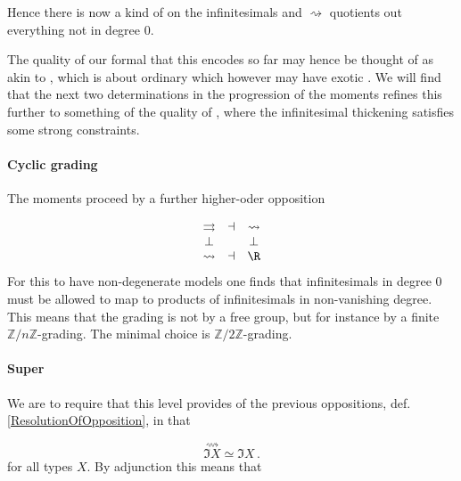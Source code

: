 \documentclass[12pt,titlepage]{article}
\newcommand{\itexarray}[1]{\begin{matrix}#1\end{matrix}}
\theoremstyle{plain}
\theoremstyle{definition}
\theoremstyle{remark}
\begin{document}
Hence there is now a kind of  on the infinitesimals and $\rightsquigarrow$ quotients out everything not in degree 0.

The  quality of our formal  that this encodes so far may hence be thought of as akin to \emph{}, which is about ordinary  which however may have exotic  . We will find that the next two determinations in the progression of the moments refines this further to something of the quality of , where the infinitesimal thickening satisfies some strong constraints.

\hypertarget{cyclic_grading}{}\paragraph*{{Cyclic grading}}\label{cyclic_grading}

The moments proceed by a further higher-oder opposition

\begin{displaymath}
\itexarray{
    \rightrightarrows &\dashv& \rightsquigarrow
    \\
    \bot && \bot
    \\
    \rightsquigarrow &\dashv& \R
  }
\end{displaymath}
For this to have non-degenerate models one finds that infinitesimals in degree 0 must be allowed to map to products of infinitesimals in non-vanishing degree. This means that the grading is not by a free group, but for instance by a finite  $\mathbb{Z}/n\mathbb{Z}$-grading. The minimal choice is $\mathbb{Z}/2\mathbb{Z}$-grading.

\hypertarget{FormalizationSuperGrading}{}\paragraph*{{Super}}\label{FormalizationSuperGrading}

We are to require that this level provides  of the previous oppositions, def. \ref{ResolutionOfOpposition}, in that

\begin{displaymath}
\stackrel{\rightsquigarrow}{\Im X} \simeq \Im X
  \,.
\end{displaymath}
for all types $X$. By adjunction this means that
\end{document}
